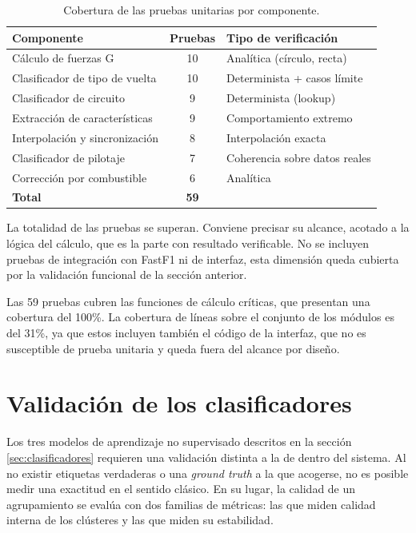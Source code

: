 \documentclass[12pt,a4paper,twoside,openright]{book}
\begin{document}
\begin{table}[htbp]
\centering
\small
\begin{tabular}{@{}p{6.2cm}cp{5.5cm}@{}}
\toprule
\textbf{Componente} & \textbf{Pruebas} & \textbf{Tipo de verificación} \\
\midrule
Cálculo de fuerzas G            & 10 & Analítica (círculo, recta) \\
Clasificador de tipo de vuelta  & 10 & Determinista + casos límite \\
Clasificador de circuito        &  9 & Determinista (lookup) \\
Extracción de características    &  9 & Comportamiento extremo \\
Interpolación y sincronización  &  8 & Interpolación exacta \\
Clasificador de pilotaje        &  7 & Coherencia sobre datos reales \\
Corrección por combustible      &  6 & Analítica \\
\midrule
\textbf{Total}                  & \textbf{59} & \\
\bottomrule
\end{tabular}
\caption{Cobertura de las pruebas unitarias por componente.}
\label{tab:cobertura_tests}
\end{table}

\noindent La totalidad de las pruebas se superan. Conviene precisar su alcance, acotado a la lógica del cálculo, que es la parte con resultado verificable. No se incluyen pruebas de integración con FastF1 ni de interfaz, esta dimensión queda cubierta por la validación funcional de la sección anterior.

\noindent Las 59 pruebas cubren las funciones de cálculo críticas, que presentan una cobertura del 100\%. La cobertura de líneas sobre el conjunto de los módulos es del 31\%, ya que estos incluyen también el código de la interfaz, que no es susceptible de prueba unitaria y queda fuera del alcance por diseño.
\section{Validación de los clasificadores}
Los tres modelos de aprendizaje no supervisado descritos en la sección \ref{sec:clasificadores} requieren una validación distinta a la de dentro del sistema. Al no existir etiquetas verdaderas o una \textit{ground truth} a la que acogerse, no es posible medir una exactitud en el sentido clásico.
En su lugar, la calidad de un agrupamiento se evalúa con dos familias de métricas: las que miden calidad interna de los clústeres y las que miden su estabilidad.
\end{document}

